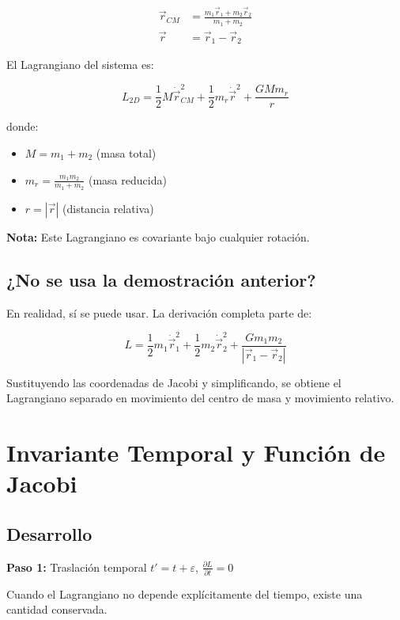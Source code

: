\documentclass[a4paper]{article}
\begin{document}
\begin{align}
\vec{r}_{CM} &= \frac{m_1\vec{r}_1 + m_2\vec{r}_2}{m_1 + m_2} \\
\vec{r} &= \vec{r}_1 - \vec{r}_2
\end{align}

El Lagrangiano del sistema es:

\begin{equation}
L_{2D} = \frac{1}{2}M\dot{\vec{r}}_{CM}^2 + \frac{1}{2}m_r\dot{\vec{r}}^2 + \frac{GMm_r}{r}
\end{equation}

donde:
\begin{itemize}
    \item $M = m_1 + m_2$ (masa total)
    \item $m_r = \frac{m_1m_2}{m_1+m_2}$ (masa reducida)
    \item $r = |\vec{r}|$ (distancia relativa)
\end{itemize}

\textbf{Nota:} Este Lagrangiano es covariante bajo cualquier rotación.

\subsection*{¿No se usa la demostración anterior?}

En realidad, sí se puede usar. La derivación completa parte de:

\begin{equation}
L = \frac{1}{2}m_1\dot{\vec{r}}_1^2 + \frac{1}{2}m_2\dot{\vec{r}}_2^2 + \frac{Gm_1m_2}{|\vec{r}_1 - \vec{r}_2|}
\end{equation}

Sustituyendo las coordenadas de Jacobi y simplificando, se obtiene el Lagrangiano separado en movimiento del centro de masa y movimiento relativo.

\section{Invariante Temporal y Función de Jacobi}

\subsection*{Desarrollo}

\textbf{Paso 1:} Traslación temporal $t' = t + \varepsilon$, $\frac{\partial L}{\partial t} = 0$

Cuando el Lagrangiano no depende explícitamente del tiempo, existe una cantidad conservada.
\end{document}
